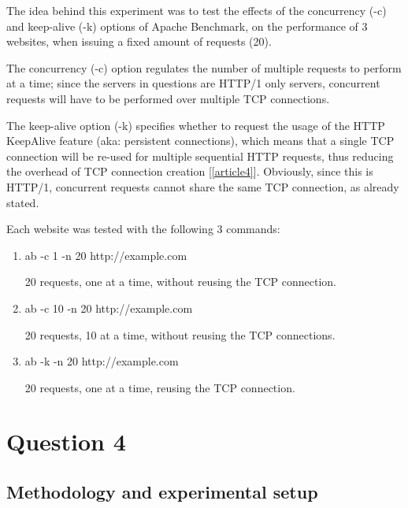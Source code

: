 \documentclass[a4paper,10pt]{article}
\begin{document}
The idea behind this experiment was to test the effects of the concurrency (-c) and keep-alive (-k) options of Apache Benchmark, on the performance of 3 websites, when issuing a fixed amount of requests (20). 

The concurrency (-c) option regulates the number of multiple requests to perform at a time; since the servers in questions are HTTP/1 only servers, concurrent requests will have to be performed over multiple TCP connections. 

The keep-alive option (-k) specifies whether to request the usage of the HTTP KeepAlive feature (aka: persistent connections), which means that a single TCP connection will be re-used for multiple sequential HTTP requests, thus reducing the overhead of TCP connection creation [\ref{article4}]. Obviously, since this is HTTP/1, concurrent requests cannot share the same TCP connection, as already stated.



Each website was tested with the following 3 commands:


\begin{enumerate}


\item ab -c 1 -n 20 http://example.com

20 requests, one at a time, without reusing the TCP connection.

\item ab -c 10 -n 20 http://example.com

20 requests, 10 at a time, without reusing the TCP connections.

\item ab -k -n 20 http://example.com

20 requests, one at a time, reusing the TCP connection.

\end{enumerate}






\section{Question 4}
\subsection{Methodology and experimental setup}
\end{document}
